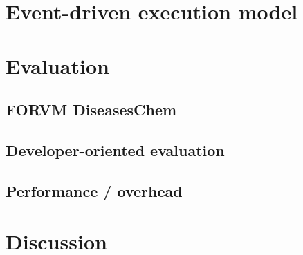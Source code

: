 \documentclass[
]{ceurart}
\begin{document}
\section{Event-driven execution model}






\section{Evaluation}

\subsection{FORVM DiseasesChem}

\subsection{Developer-oriented evaluation}





\subsection{Performance / overhead}


\section{Discussion}
\end{document}
